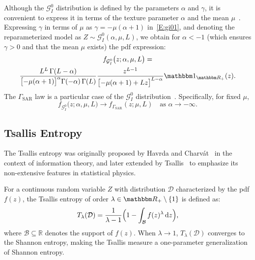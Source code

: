 \documentclass[
  lettersize  journal,
]{IEEEtran}%
\begin{document}
Although the \(\mathcal{G}^0_I\) distribution is defined by the
parameters \(\alpha\) and \(\gamma\), it is convenient to express it in
terms of the texture parameter \(\alpha\) and the mean
\(\mu\)~. Expressing \(\gamma\)
in terms of \(\mu\) as \(\gamma=-\mu(\alpha+1)\) in~\eqref{E:gi01}, and
denoting the reparameterized model as
\(Z \sim \mathcal{G}^0_I(\alpha,\mu,L)\), we obtain for \(\alpha<-1\)
(which ensures \(\gamma>0\) and that the mean \(\mu\) exists) the pdf
expression: \begin{multline}
    f_{\mathcal{G}^0_I}\bigl(z; \alpha, \mu, L \bigr) 
    = \\
    \frac{L^L\,\Gamma(L-\alpha)}
    {\bigl[-\mu(\alpha+1)\bigr]^{\alpha} \Gamma(-\alpha)\,\Gamma(L)}
    \frac{z^{L-1}}
    {\bigl[-\mu(\alpha+1)+Lz\bigr]^{L-\alpha}}
    \mathbbm 1_{\mathbbm R_+}(z). \label{E:gi02}
\end{multline} The \(\Gamma_{\mathrm{SAR}}\) law is a particular case of
the \(\mathcal{G}^0_I\) distribution~.
Specifically, for fixed \(\mu\), \[
  f_{\mathcal{G}^0_I}\bigl(z;\alpha,\mu,L\bigr)
  \longrightarrow
  f_{\Gamma_{\mathrm{SAR}}}(z;\mu,L)
  \quad \text{as } \alpha \to -\infty.
\]

\subsection{Tsallis Entropy}\label{tsallis-entropy}

The Tsallis entropy was originally proposed by Havrda and
Charvát~ in the context of
information theory, and later extended by
Tsallis~ to emphasize its
non-extensive features in statistical physics.

For a continuous random variable \(Z\) with distribution \(\mathcal D\)
characterized by the pdf \(f(z)\), the Tsallis entropy of order
\(\lambda \in \mathbbm R_+ \setminus \{1\}\) is defined as:
\begin{equation}
\label{eq:tsallis}
T_\lambda(\mathcal D) = \frac{1}{\lambda - 1} \Bigl( 1 - \int_{\mathcal{B}} f(z)^{\lambda} \,\mathrm{d}z \Bigr),
\end{equation} where \(\mathcal{B} \subseteq \mathbb{R}\) denotes the
support of \(f(z)\). When \(\lambda \to 1\), \(T_\lambda(\mathcal D)\)
converges to the Shannon entropy, making the Tsallis measure a
one-parameter generalization of Shannon entropy.
\end{document}
